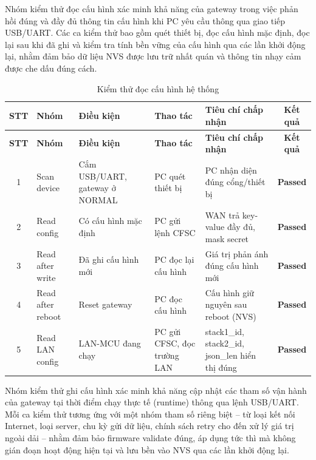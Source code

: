         Nhóm kiểm thử đọc cấu hình xác minh khả năng của gateway trong việc phản hồi đúng và đầy đủ thông tin cấu hình khi PC yêu cầu thông qua giao tiếp USB/UART. Các ca kiểm thử bao gồm quét thiết bị, đọc cấu hình mặc định, đọc lại sau khi đã ghi và kiểm tra tính bền vững của cấu hình qua các lần khởi động lại, nhằm đảm bảo dữ liệu NVS được lưu trữ nhất quán và thông tin nhạy cảm được che dấu đúng cách.

        \begin{longtable}{|c|p{2cm}|p{3.5cm}|p{2.5cm}|p{4cm}|c|}
            \caption{Kiểm thử đọc cấu hình hệ thống}
            \label{tab:test_read_config} \\
            \hline
            \textbf{STT} & \textbf{Nhóm} & \textbf{Điều kiện} & \textbf{Thao tác} & \textbf{Tiêu chí chấp nhận} & \textbf{Kết quả} \\ \hline
            \endfirsthead

            \hline
            \textbf{STT} & \textbf{Nhóm} & \textbf{Điều kiện} & \textbf{Thao tác} & \textbf{Tiêu chí chấp nhận} & \textbf{Kết quả} \\ \hline
            \endhead

            \hline
            \endfoot
            \endlastfoot

            1 & Scan device & Cắm USB/UART, gateway ở NORMAL & PC quét thiết bị & PC nhận diện đúng cổng/thiết bị & \textcolor{modern_blue}{\textbf{Passed}} \\ \hline
            2 & Read config & Có cấu hình mặc định & PC gửi lệnh CFSC & WAN trả key-value đầy đủ, mask secret & \textcolor{modern_blue}{\textbf{Passed}} \\ \hline
            3 & Read after write & Đã ghi cấu hình mới & PC đọc lại cấu hình & Giá trị phản ánh đúng cấu hình mới & \textcolor{modern_blue}{\textbf{Passed}} \\ \hline
            4 & Read after reboot & Reset gateway & PC đọc cấu hình & Cấu hình giữ nguyên sau reboot (NVS) & \textcolor{modern_blue}{\textbf{Passed}} \\ \hline
            5 & Read LAN config & LAN-MCU đang chạy & PC gửi CFSC, đọc trường LAN & stack1\_id, stack2\_id, json\_len hiển thị đúng & \textcolor{modern_blue}{\textbf{Passed}} \\ \hline
        \end{longtable}

        Nhóm kiểm thử ghi cấu hình xác minh khả năng cập nhật các tham số vận hành của gateway tại thời điểm chạy thực tế (runtime) thông qua lệnh USB/UART. Mỗi ca kiểm thử tương ứng với một nhóm tham số riêng biệt -- từ loại kết nối Internet, loại server, chu kỳ gửi dữ liệu, chính sách retry cho đến xử lý giá trị ngoài dải -- nhằm đảm bảo firmware validate đúng, áp dụng tức thì mà không gián đoạn hoạt động hiện tại và lưu bền vào NVS qua các lần khởi động lại.


